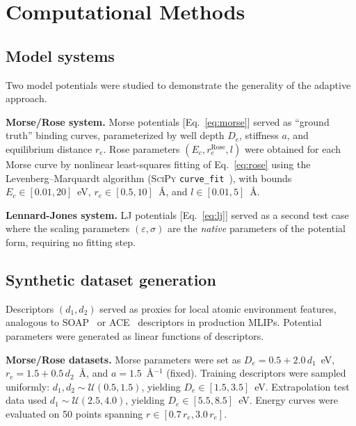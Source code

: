 \documentclass[aps,prb,twocolumn,superscriptaddress,longbibliography,floatfix]{revtex4-2}
\begin{document}
\section{Computational Methods}
\label{sec:methods}

\subsection{Model systems}
\label{sec:model_systems}

Two model potentials were studied to demonstrate the generality of the adaptive approach.

\textbf{Morse/Rose system.} Morse potentials [Eq.~\eqref{eq:morse}] served as ``ground truth'' binding curves, parameterized by well depth $D_e$, stiffness $a$, and equilibrium distance $r_e$. Rose parameters $(E_c, r_e^\mathrm{Rose}, l)$ were obtained for each Morse curve by nonlinear least-squares fitting of Eq.~\eqref{eq:rose} using the Levenberg--Marquardt algorithm (\textsc{SciPy} \texttt{curve\_fit}~\cite{Virtanen2020}), with bounds $E_c \in [0.01, 20]$~eV, $r_e \in [0.5, 10]$~\AA, and $l \in [0.01, 5]$~\AA.

\textbf{Lennard-Jones system.} LJ potentials [Eq.~\eqref{eq:lj}] served as a second test case where the scaling parameters $(\varepsilon, \sigma)$ are the \emph{native} parameters of the potential form, requiring no fitting step.

\subsection{Synthetic dataset generation}
\label{sec:datasets}

Descriptors $(d_1, d_2)$ served as proxies for local atomic environment features, analogous to SOAP~\cite{Bartok2010} or ACE~\cite{Drautz2019} descriptors in production MLIPs. Potential parameters were generated as linear functions of descriptors.

\textbf{Morse/Rose datasets.} Morse parameters were set as $D_e = 0.5 + 2.0\, d_1$~eV, $r_e = 1.5 + 0.5\, d_2$~\AA, and $a = 1.5$~\AA$^{-1}$ (fixed). Training descriptors were sampled uniformly: $d_1, d_2 \sim \mathcal{U}(0.5, 1.5)$, yielding $D_e \in [1.5, 3.5]$~eV. Extrapolation test data used $d_1 \sim \mathcal{U}(2.5, 4.0)$, yielding $D_e \in [5.5, 8.5]$~eV. Energy curves were evaluated on 50 points spanning $r \in [0.7\, r_e, 3.0\, r_e]$.
\end{document}
